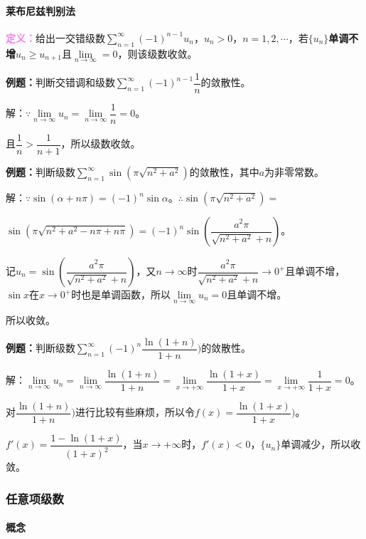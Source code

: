 \documentclass[UTF8, 12pt]{ctexart}
\begin{document}
\paragraph{莱布尼兹判别法} \leavevmode \medskip

\textcolor{violet}{\textbf{定义：}}给出一交错级数$\sum\limits_{n=1}^\infty(-1)^{n-1}u_n$，$u_n>0$，$n=1,2,\cdots$，若$\{u_n\}$\textbf{单调不增}$u_n\geqslant u_{n+1}$且$\lim\limits_{n\to\infty}=0$，则该级数收敛。

\textbf{例题：}判断交错调和级数$\sum\limits_{n=1}^\infty(-1)^{n-1}\dfrac{1}{n}$的敛散性。

解：$\because\lim\limits_{n\to\infty}u_n=\lim\limits_{n\to\infty}\dfrac{1}{n}=0$。

且$\dfrac{1}{n}>\dfrac{1}{n+1}$，所以级数收敛。

\textbf{例题：}判断级数$\sum\limits_{n=1}^\infty\sin(\pi\sqrt{n^2+a^2})$的敛散性，其中$a$为非零常数。

解：$\because\sin(\alpha+n\pi)=(-1)^n\sin\alpha$。$\therefore\sin(\pi\sqrt{n^2+a^2})=$

$\sin(\pi\sqrt{n^2+a^2-n\pi+n\pi})=(-1)^n\sin\left(\dfrac{a^2\pi}{\sqrt{n^2+a^2}+n}\right)$。

记$u_n=\sin\left(\dfrac{a^2\pi}{\sqrt{n^2+a^2}+n}\right)$，又$n\to\infty$时$\dfrac{a^2\pi}{\sqrt{n^2+a^2}+n}\to0^+$且单调不增，$\sin x$在$x\to0^+$时也是单调函数，所以$\lim\limits_{n\to\infty}u_n=0$且单调不增。

所以收敛。

\textbf{例题：}判断级数$\sum\limits_{n=1}^\infty(-1)^n\dfrac{\ln(1+n)}{1+n})$的敛散性。

解：$\lim\limits_{n\to\infty}u_n=\lim\limits_{n\to\infty}\dfrac{\ln(1+n)}{1+n}=\lim\limits_{x\to+\infty}\dfrac{\ln(1+x)}{1+x}=\lim\limits_{x\to+\infty}\dfrac{1}{1+x}=0$。

对$\dfrac{\ln(1+n)}{1+n})$进行比较有些麻烦，所以令$f(x)=\dfrac{\ln(1+x)}{1+x})$。

$f'(x)=\dfrac{1-\ln(1+x)}{(1+x)^2}$，当$x\to+\infty$时，$f'(x)<0$，$\{u_n\}$单调减少，所以收敛。

\subsubsection{任意项级数}

\paragraph{概念} \leavevmode \medskip
\end{document}
